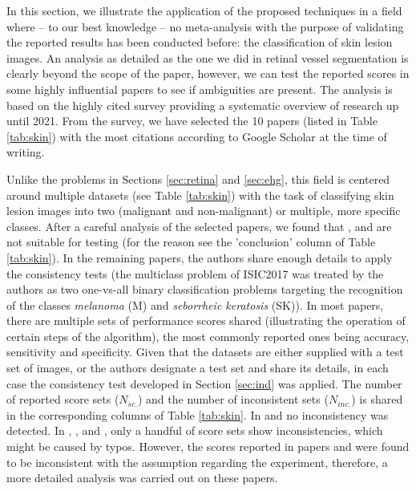 \documentclass[5p, final]{elsarticle}
\begin{document}
In this section, we illustrate the application of the proposed techniques in a field where -- to our best knowledge -- no meta-analysis with the purpose of validating the reported results has been conducted before: the classification of skin lesion images. An analysis as detailed as the one we did in retinal vessel segmentation \cite{vessel} is clearly beyond the scope of the paper, however, we can test the reported scores in some highly influential papers to see if ambiguities are present. The analysis is based on the highly cited survey \cite{skinsurvey} providing a systematic overview of research up until 2021. From the survey, we have selected the 10 papers (listed in Table \ref{tab:skin}) with the most citations according to Google Scholar at the time of writing.

Unlike the problems in Sections \ref{sec:retina} and \ref{sec:ehg}, this field is centered around multiple datasets (see Table \ref{tab:skin}) with the task of classifying skin lesion images into two (malignant and non-malignant) or multiple, more specific classes. After a careful analysis of the selected papers, we found that \cite{skin1}, \cite{skin4} and \cite{skin6} are not suitable for testing (for the reason see the 'conclusion' column of Table \ref{tab:skin}). In the remaining papers, the authors share enough details to apply the consistency tests (the multiclass problem of ISIC2017 \cite{isic2017} was treated by the authors as two one-vs-all binary classification problems targeting the recognition of the classes \emph{melanoma} (M) and \emph{seborrheic keratosis} (SK)). In most papers, there are multiple sets of performance scores shared (illustrating the operation of certain steps of the algorithm), the most commonly reported ones being accuracy, sensitivity and specificity. Given that the datasets are either supplied with a test set of images, or the authors designate a test set and share its details, in each case the consistency test developed in Section \ref{sec:ind} was applied. The number of reported score sets ($N_{sc.}$) and the number of inconsistent sets ($N_{inc.}$) is shared in the corresponding columns of Table \ref{tab:skin}. In \cite{skin5} and \cite{skin8} no inconsistency was detected. In \cite{skin0}, \cite{skin2}, and \cite{skin3}, only a handful of score sets show inconsistencies, which might be caused by typos. However, the scores reported in papers \cite{skin7} and \cite{skin9} were found to be inconsistent with the assumption regarding the experiment, therefore, a more detailed analysis was carried out on these papers.
\end{document}
